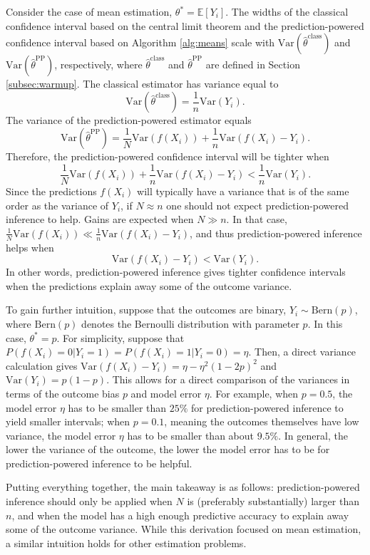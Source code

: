 \documentclass[10pt]{article}
\def\E{\mathbb{E}}
\newcommand{\Var}{\mathrm{Var}}
\newcommand{\thetaclass}{\hat{\theta}^{\mathrm{class}}}
\newcommand{\thetaPP}{\hat{\theta}^{\mathrm{PP}}}
\begin{document}
Consider the case of mean estimation, $\theta^* = \E[Y_i]$. 
The widths of the classical confidence interval based on the central limit theorem and the prediction-powered confidence interval based on Algorithm \ref{alg:means} scale with $\Var(\thetaclass)$ and $\Var(\thetaPP)$, respectively, where $\thetaclass$ and $\thetaPP$ are defined in Section \ref{subsec:warmup}. The classical estimator has variance equal to
$$\Var(\thetaclass) = \frac{1}{n}\Var(Y_i).$$
The variance of the prediction-powered estimator equals
$$\Var(\thetaPP) = \frac{1}{N}\Var(f(X_i)) + \frac{1}{n}\Var(f(X_i) - Y_i).$$
Therefore, the prediction-powered confidence interval will be tighter when
$$\frac{1}{N}\Var(f(X_i)) + \frac{1}{n}\Var(f(X_i) - Y_i) < \frac 1 n \Var(Y_i).$$
Since the predictions $f(X_i)$ will typically have a variance that is of the same order as the variance of $Y_i$, if $N\approx n$ one should not expect prediction-powered inference to help. Gains are expected when $N\gg n$. In that case, $\frac{1}{N}\Var(f(X_i)) \ll \frac{1}{n}\Var(f(X_i) - Y_i)$, and thus prediction-powered inference helps when
$$\Var(f(X_i) - Y_i) <  \Var(Y_i).$$
In other words, prediction-powered inference gives tighter confidence intervals when the predictions explain away some of the outcome variance.

To gain further intuition, suppose that the outcomes are binary, $Y_i\sim \mathrm{Bern}(p)$, where $\mathrm{Bern}(p)$ denotes the Bernoulli distribution with parameter $p$. In this case, $\theta^* = p$. For simplicity, suppose that $P(f(X_i) = 0 | Y_i = 1) = P(f(X_i) = 1 | Y_i = 0) = \eta$. Then, a direct variance calculation gives $\Var(f(X_i) - Y_i) = \eta - \eta^2(1-2p)^2$ and $\Var(Y_i) = p(1-p)$. This allows for a direct comparison of the variances in terms of the outcome bias $p$ and model error $\eta$. For example, when $p=0.5$, the model error $\eta$ has to be smaller than $25\%$ for prediction-powered inference to yield smaller intervals; when $p=0.1$, meaning the outcomes themselves have low variance, the model error $\eta$ has to be smaller than about $9.5\%$. In general, the lower the variance of the outcome, the lower the model error has to be for prediction-powered inference to be helpful.

Putting everything together, the main takeaway is as follows: prediction-powered inference should only be applied when $N$ is (preferably substantially) larger than $n$, and when the model has a high enough predictive accuracy to explain away some of the outcome variance. While this derivation focused on mean estimation, a similar intuition holds for other estimation problems.
\end{document}
